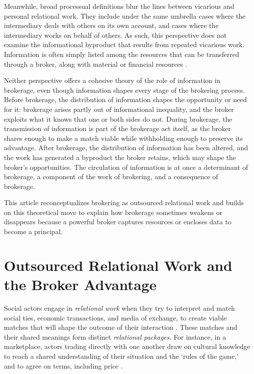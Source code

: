\documentclass[
]{article}
\begin{document}
Meanwhile, broad processual definitions blur the lines between vicarious and personal relational work. They include under the same umbrella cases where the intermediary deals with others on its own account, and cases where the intermediary works on behalf of others. As such, this perspective does not examine the informational byproduct that results from repeated vicarious work. Information is often simply listed among the resources that can be transferred through a broker, along with material or financial resources \autocites[see, e.g.][141]{obstfeldBrokerageProcessDecoupling2014}[141]{stovelBrokerage2012}.

Neither perspective offers a cohesive theory of the role of information in brokerage, even though information shapes every stage of the brokering process. Before brokerage, the distribution of information shapes the opportunity or need for it: brokerage arises partly out of informational inequality, and the broker exploits what it knows that one or both sides do not. During brokerage, the transmission of information is part of the brokerage act itself, as the broker shares enough to make a match viable while withholding enough to preserve its advantage. After brokerage, the distribution of information has been altered, and the work has generated a byproduct the broker retains, which may shape the broker's opportunities. The circulation of information is at once a determinant of brokerage, a component of the work of brokering, and a consequence of brokerage.

This article reconceptualizes brokering as outsourced relational work and builds on this theoretical move to explain how brokerage sometimes weakens or disappears because a powerful broker captures resources or encloses data to become a principal.

\section{Outsourced Relational Work and the Broker Advantage}

Social actors engage in \emph{relational work} when they try to interpret and match social ties, economic transactions, and media of exchange, to create viable matches that will shape the outcome of their interaction \autocites[151]{zelizerHowBecameRelational2012}{zelizerPurchaseIntimacy2005}[see also][255]{bandeljRelationalWorkEconomy2020}. These matches and their shared meanings form distinct \emph{relational packages}. For instance, in a marketplace, actors trading directly with one another draw on cultural knowledge to reach a shared understanding of their situation and the `rules of the game,' and to agree on terms, including price \autocite[137]{blockRelationalWorkMarket2012}.
\end{document}
